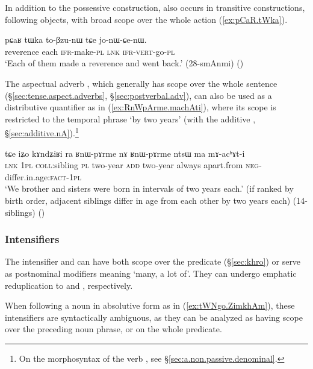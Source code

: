 In addition to the possessive construction,  also occurs in transitive constructions, following objects, with broad scope over the whole action (\ref{ex:pCaR.tWka}).

\begin{exe}
\ex \label{ex:pCaR.tWka}
\gll  pɕaʁ tɯka to-βzu-nɯ tɕe jo-nɯ-ɕe-nɯ.  \\
reverence each \textsc{ifr}-make-\textsc{pl} \textsc{lnk} \textsc{ifr}-\textsc{vert}-go-\textsc{pl} \\
\glt `Each of them made a reverence and went back.'  (28-smAnmi) ()
\end{exe}

The aspectual adverb , which generally has scope over the whole sentence (§\ref{sec:tense.aspect.adverbs}, §\ref{sec:postverbal.adv}), can also be used as a distributive quantifier as in (\ref{ex:RnWpArme.machAti}), where its scope is restricted to the temporal phrase  `by two years' (with the additive , §\ref{sec:additive.nA}).\footnote{On the morphosyntax of the verb , see §\ref{sec:a.non.passive.denominal}.  }

\begin{exe}
\ex   \label{ex:RnWpArme.machAti}
 \gll tɕe iʑo kɤndʑiʁi ra ʁnɯ-pɤrme nɤ ʁnɯ-pɤrme ntsɯ ma mɤ-acʰɤt-i \\
 \textsc{lnk} \textsc{1pl} \textsc{coll}:sibling \textsc{pl} two-year \textsc{add} two-year always apart.from \textsc{neg}-differ.in.age:\textsc{fact}-\textsc{1pl} \\
\glt `We brother and sisters were born in intervals of two years each.' (if ranked by birth order, adjacent siblings differ in age from each other by two years each) (14-siblings) ()
 \end{exe}
 
\subsubsection{Intensifiers} \label{sec:nominal.intensifier}
The intensifier  and  can have both scope over the predicate (§\ref{sec:khro}) or serve as postnominal modifiers meaning `many, a lot of'. They can undergo emphatic reduplication to  and , respectively.

When following a noun in absolutive form as in (\ref{ex:tWNgo.ZimkhAm}), these intensifiers are syntactically ambiguous, as they can be analyzed as having scope over the preceding noun phrase, or on the whole predicate.

